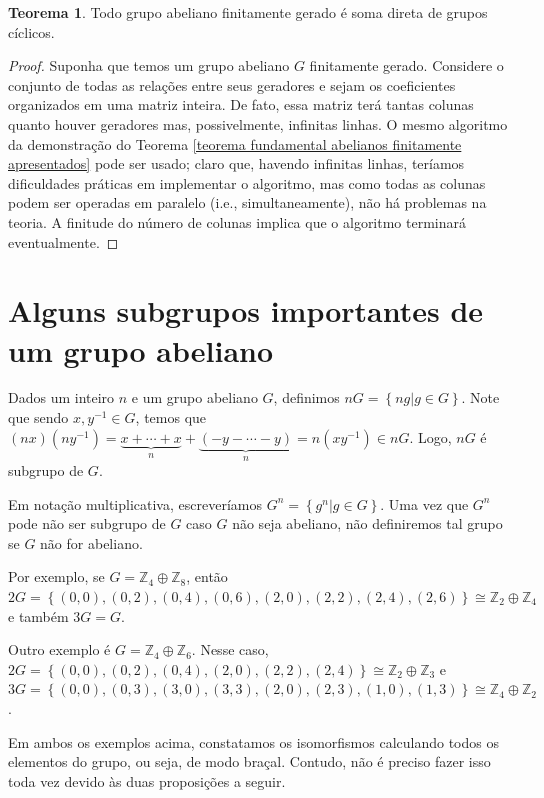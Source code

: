 \documentclass[a4paper,portuguese,11pt,twoside, leqno]{book}
\theoremstyle{definition}
\newtheorem{theorem}{Teorema}[section]
\begin{document}
	\begin{theorem}
		\label{teorema fundamental abelianos finitamente gerados}
		Todo grupo abeliano finitamente gerado é soma direta de grupos cíclicos.
	\end{theorem}
	\begin{proof}
		Suponha que temos um grupo abeliano $G$ finitamente gerado. Considere o conjunto de todas as relações entre seus geradores e sejam os coeficientes organizados em uma matriz inteira. De fato, essa matriz terá tantas colunas quanto houver geradores mas, possivelmente, infinitas linhas. O mesmo algoritmo da demonstração do Teorema \eqref{teorema fundamental abelianos finitamente apresentados} pode ser usado; claro que, havendo infinitas linhas, teríamos dificuldades práticas em implementar o algoritmo, mas como todas as colunas podem ser operadas em paralelo (i.e., simultaneamente), não há problemas na teoria. A finitude do número de colunas implica que o algoritmo terminará eventualmente.
	\end{proof}
	\section{Alguns subgrupos importantes de um grupo abeliano}
	\hspace{12pt} Dados um inteiro $n$ e um grupo abeliano $G$, definimos $nG = \left\{ ng\vert g\in G \right\}$. Note que sendo $x,y^{-1}\in G$, temos que $(nx)(ny^{-1}) = \underbrace{x+\cdots+x}_{n} + \underbrace{(-y-\cdots-y)}_{n} = n(xy^{-1})\in nG$. Logo, $nG$ é subgrupo de $G$. 
	\par\vspace{0.3cm} Em notação multiplicativa, escreveríamos $G^n = \left\{ g^n\vert g\in G \right\}$. Uma vez que $G^n$ pode não ser subgrupo de $G$ caso $G$ não seja abeliano, não definiremos tal grupo se $G$ não for abeliano.
	\par\vspace{0.3cm} Por exemplo, se $G = \mathbb{Z}_4\oplus\mathbb{Z}_8$, então $2G = \left\{ (0,0), (0,2), (0,4), (0,6), (2,0), (2,2), (2,4), (2, 6) \right\}\cong \mathbb{Z}_2\oplus\mathbb{Z}_4$ e também $3G=G$. 
	\par\vspace{0.3cm} Outro exemplo é $G = \mathbb{Z}_4\oplus\mathbb{Z}_6$. Nesse caso, $2G = \left\{ (0,0), (0,2), (0,4), (2,0), (2,2), (2,4) \right\}\cong \mathbb{Z}_2\oplus\mathbb{Z}_3$ e $3G = \left\{ (0,0), (0,3), (3,0), (3,3), (2,0), (2,3), (1,0), (1,3) \right\}\cong \mathbb{Z}_4\oplus\mathbb{Z}_2$. 
	\par\vspace{0.3cm} Em ambos os exemplos acima, constatamos os isomorfismos calculando todos os elementos do grupo, ou seja, de modo braçal. Contudo, não é preciso fazer isso toda vez devido às duas proposições a seguir.
	
\end{document}
